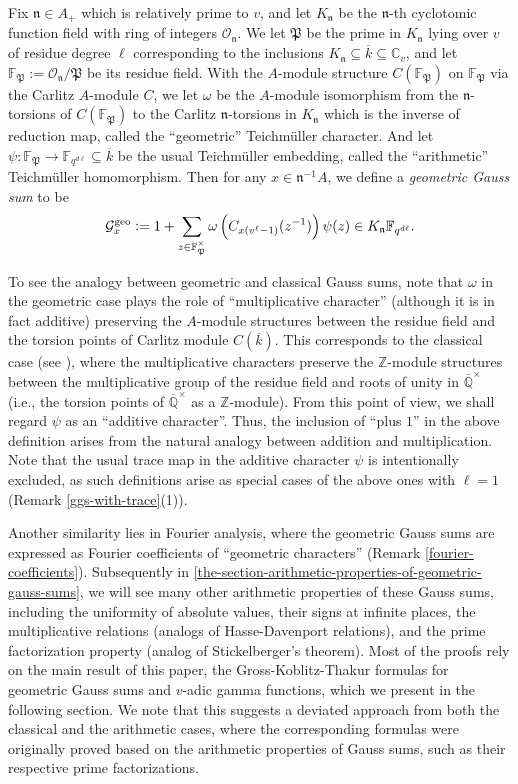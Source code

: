 \documentclass[11pt]{amsart}
\theoremstyle{plain}
\theoremstyle{definition}
\theoremstyle{remark}
\numberwithin{equation}{section}
\newcommand{\ZZ}{\mathbb{Z}}
\newcommand{\QQ}{\mathbb{Q}}
\newcommand{\CC}{\mathbb{C}}
\newcommand{\FF}{\mathbb{F}}
\newcommand{\nfk}{\mathfrak{n}}
\newcommand{\Pfk}{\mathfrak{P}}
\newcommand{\Gcal}{\mathcal{G}}
\newcommand{\Ocal}{\mathcal{O}}
\newcommand{\ovl}{\overline}
\newcommand{\sbe}{\subseteq}
\newcommand{\Fqdl}{\FF_{q^{d\l}}}
\newcommand{\bggs}{\Gcal^{\textnormal{geo}}}
\let\l\ell
\begin{document}
	Fix $\nfk \in A_+$ which is relatively prime to $v$, and let $K_\nfk$ be the $\nfk$-th cyclotomic function field with ring of integers $\Ocal_{\nfk}$.
	We let $\Pfk$ be the prime in $K_\nfk$ lying over $v$ of residue degree $\l$ corresponding to the inclusions $K_\nfk \sbe \ovl{k} \sbe \CC_v$, and let $\FF_\Pfk := \Ocal_{\nfk}/\Pfk$ be its residue field.
	With the $A$-module structure $C(\FF_{\Pfk})$ on $\FF_{\Pfk}$ via the Carlitz $A$-module $C$, we let $\omega$ be the $A$-module isomorphism from the $\nfk$-torsions of $C(\FF_{\Pfk})$ to the Carlitz $\nfk$-torsions in $K_\nfk$ which is the inverse of reduction map, called the “geometric” Teichmüller character.
	And let $\psi : \FF_\Pfk \to \Fqdl \sbe \ovl{k}$ be the usual Teichmüller embedding, called the “arithmetic” Teichmüller homomorphism.
	Then for any $x \in \nfk^{-1}A$, we define a \textit{geometric Gauss sum} to be
	$$
	\bggs_x
	:= 1 + \sum_{z \in \FF_\Pfk^\times} \omega\left(C_{x(v^\l-1)} (z^{-1})\right)\psi(z) \in K_\nfk\Fqdl.
	$$
	
	To see the analogy between geometric and classical Gauss sums, note that $\omega$ in the geometric case plays the role of “multiplicative character” (although it is in fact additive) preserving the $A$-module structures between the residue field and the torsion points of Carlitz module $C(\ovl{k})$.
	This corresponds to the classical case (see \cite[(1.2)]{gk1979gauss}), where the multiplicative characters preserve the $\ZZ$-module structures between the multiplicative group of the residue field and roots of unity in $\ovl{\QQ}^\times$ (i.e., the torsion points of $\ovl{\QQ}^\times$ as a $\ZZ$-module).
	From this point of view, we shall regard $\psi$ as an “additive character”.
	Thus, the inclusion of “plus $1$” in the above definition arises from the natural analogy between addition and multiplication.
	Note that the usual trace map in the additive character $\psi$ is intentionally excluded, as such definitions arise as special cases of the above ones with $\l=1$ (Remark \ref{ggs-with-trace}(1)).
	
	Another similarity lies in Fourier analysis, where the geometric Gauss sums are expressed as Fourier coefficients of “geometric characters” (Remark \ref{fourier-coefficients}).
	Subsequently in \ref{the-section-arithmetic-properties-of-geometric-gauss-sums}, we will see many other arithmetic properties of these Gauss sums, including the uniformity of absolute values, their signs at infinite places, the multiplicative relations (analogs of Hasse-Davenport relations), and the prime factorization property (analog of Stickelberger's theorem).
	Most of the proofs rely on the main result of this paper, the Gross-Koblitz-Thakur formulas for geometric Gauss sums and $v$-adic gamma functions, which we present in the following section.
	We note that this suggests a deviated approach from both the classical and the arithmetic cases, where the corresponding formulas were originally proved based on the arithmetic properties of Gauss sums, such as their respective prime factorizations.
	
\end{document}
